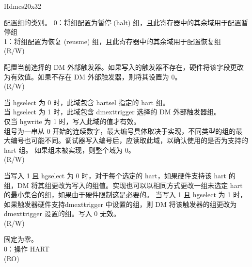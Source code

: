 \begin{register}{H}{dmcs2}{0x32}\label{regdesc:dmcs2}
%
%
%
%
%
%
\regnewline%
\begin{regdesc}\begin{reglist}
\label{fielddesc:grouptype}\item [grouptype] 配置组的类别。
0：将组配置为暂停 (halt) 组，且此寄存器中的其余域用于配置暂停组 \\
1：将组配置为恢复 (reusme) 组，且此寄存器中的其余域用于配置恢复组 \\
(R/W)
\label{fielddesc:dmexttrigger}\item [dmexttrigger] 配置当前选择的 DM 外部触发器。如果写入的触发器不存在，硬件将该字段更改为有效值。如果不存在 DM 外部触发器，则将其设置为 0。\\
(R/W)
\label{fielddesc:group}\item [group] 当 hgselect 为 0 时，此域包含 hartsel 指定的 hart 组。\\
当 hgselect 为 1 时，此域包含 dmexttrigger 选择的 DM 外部触发器组。\\
仅当 hgwrite 为 1 时，写入此域的值才有效。\\
组号为一串从 0 开始的连续数字，最大编号具体取决于实现，不同类型的组的最大编号也可能不同。调试器写入编号后，应读取此域，以确认使用的是否为支持的 hart 组。
如果组未被实现，则整个域为 0。\\
(R/W)
\label{fielddesc:hgwrite}\item [hgwrite] 当写入 1 且 hgselect 为 0 时，对于每个选定的 hart，如果硬件支持该 hart 的组，DM 将其组更改为写入的组值。实现也可以以相同方式更改一组未选定 hart 的最小集合的组，如果由于硬件限制这是必要的。
当写入 1 且 hgselect 为 1 时，如果触发器硬件支持dmexttrigger 中设置的组，则 DM 将该触发器的组更改为 dmexttrigger 设置的组。写入 0 无效。\\
(R/W)
\label{fielddesc:hgselect}\item [hgselect] 固定为零。\\
0：操作 HART\\
(RO)
\end{reglist}\end{regdesc}
\end{register}
